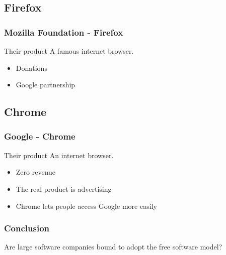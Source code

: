 \documentclass{beamer}
\begin{document}
\subsection{Firefox}

\begin{frame}

  \frametitle{Mozilla Foundation - Firefox}

  \begin{block}{Their product}
    A famous internet browser.
  \end{block}

  \vfill

  \begin{itemize}
    \item<2>{Donations}
    \item<3>{Google partnership}
  \end{itemize}

\end{frame}

\subsection{Chrome}

\begin{frame}

  \frametitle{Google - Chrome}

  \begin{block}{Their product}
    An internet browser.
  \end{block}

  \vfill

  \begin{itemize}
    \item<2>{Zero revenue}
    \item<3>{The real product is advertising}
    \item<4>{Chrome lets people access Google more easily}
  \end{itemize}

\end{frame}

\begin{frame}

  \frametitle{Conclusion}

  \begin{block}{}
    \begin{center}Are large software companies bound to adopt the free software
    model?\end{center}
  \end{block}



\end{frame}
\end{document}
